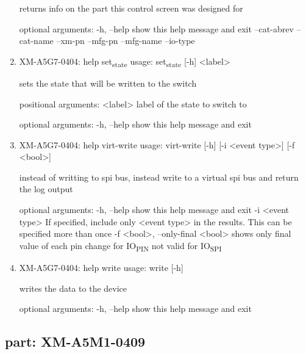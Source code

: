 \documentclass[11pt]{article}
\begin{document}
\begin{enumerate}
returns info on the part this control screen was designed for

optional arguments:
  -h, --help   show this help message and exit
  --cat-abrev
  --cat-name
  --xm-pn
  --mfg-pn
  --mfg-name
  --io-type

\item XM-A5G7-0404: help set\textsubscript{state}
\label{sec:org3e75312}
usage: set\textsubscript{state} [-h] <label>

sets the state that will be written to the switch

positional arguments:
  <label>     label of the state to switch to

optional arguments:
  -h, --help  show this help message and exit

\item XM-A5G7-0404: help virt-write
\label{sec:org24bc13d}
usage: virt-write [-h] [-i <event type>] [-f <bool>]

instead of writting to spi bus, instead write to a virtual spi bus and return
the log output

optional arguments:
  -h, --help            show this help message and exit
  -i <event type>       If specified, include only <event type> in the
                        results. This can be specified more than once
  -f <bool>, --only-final <bool>
                        shows only final value of each pin change for IO\textsubscript{PIN}
                        not valid for IO\textsubscript{SPI}

\item XM-A5G7-0404: help write
\label{sec:org04de715}
usage: write [-h]

writes the data to the device

optional arguments:
  -h, --help  show this help message and exit
\end{enumerate}

\subsection{part: XM-A5M1-0409}
\label{sec:orgbc57919}
\end{document}
